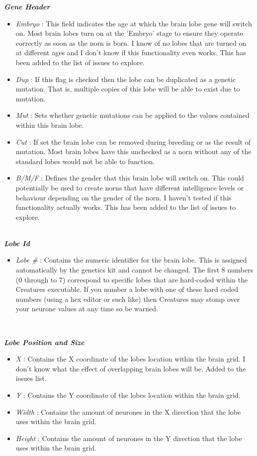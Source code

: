 \documentclass[11pt,twoside,a4paper]{article}
\begin{document}
\textbf{\textit{Gene Header}}
\begin{itemize}
	\item[] \emph{Embryo} : This field indicates the age at which the brain lobe gene will switch on. Most brain lobes turn on at the 'Embryo' stage to ensure they operate correctly as soon as the norn is born. I know of no lobes that are turned on at different ages and I don't know if this functionality even works. This has been added to the list of issues to explore.
	\item[] \emph{Dup} : If this flag is checked then the lobe can be duplicated as a genetic mutation. That is, multiple copies of this lobe will be able to exist due to mutation.
	\item[] \emph{Mut} : Sets whether genetic mutations can be applied to the values contained within this brain lobe.
	\item[] \emph{Cut} : If set the brain lobe can be removed during breeding or as the result of mutation. Most brain lobes have this unchecked as a norn without any of the standard lobes would not be able to function.
	\item[] \emph{B/M/F} : Defines the gender that this brain lobe will switch on. This could potentially be used to create norns that have different intelligence levels or behaviour depending on the gender of the norn. I haven't tested if this functionality actually works. This has been added to the list of issues to explore.
\end{itemize}~\\

\textbf{\textit{Lobe Id}}
\begin{itemize}
	\item[] \emph{Lobe \#} : Contains the numeric identifier for the brain lobe. This is assigned automatically by the genetics kit and cannot be changed. The first 8 numbers (0 through to 7) correspond to specific lobes that are hard-coded within the Creatures executable. If you number a lobe with one of these hard coded numbers (using a hex editor or such like) then Creatures may stomp over your neurone values at any time so be warned.
\end{itemize}~\\

\clearpage

\textbf{\textit{Lobe Position and Size}}
\begin{itemize}
	\item[] \emph{X} : Contains the X coordinate of the lobes location within the brain grid. I don't know what the effect of overlapping brain lobes will be. Added to the issues list.
	\item[] \emph{Y} : Contains the Y coordinate of the lobes location within the brain grid.
	\item[] \emph{Width} : Contains the amount of neurones in the X direction that the lobe uses within the brain grid.
	\item[] \emph{Height} : Contains the amount of neurones in the Y direction that the lobe uses within the brain grid.
\end{itemize}
\end{document}
